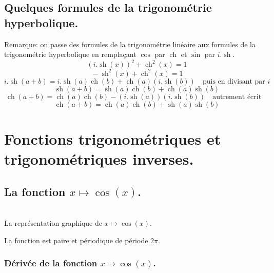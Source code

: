 \documentclass[a4paper,12pt]{report}
\renewcommand{\sinh}{\mathop{\mathrm{sh}}}
\renewcommand{\cosh}{\mathop{\mathrm{ch}}}
\begin{document}
\section{Quelques formules de la trigonométrie hyperbolique.}
Remarque:
on passe des formules de la trigonométrie linéaire aux formules de la trigonométrie hyperbolique en remplaçant $\cos$ par $\cosh$ et $\sin$ par $i . \sinh$.
\begin{equation*}
\quad  (i.\sinh\nolimits(x))^2 + \cosh\nolimits^2(x)  = 1 
\end{equation*}
\begin{equation}
\quad  -\sinh\nolimits^2(x) + \cosh\nolimits^2(x)  = 1 
\end{equation}
\begin{equation*}
i . \sinh(a+b)  = i . \sinh(a)\cosh(b) + \cosh(a)(i . \sinh(b)) \quad \textrm{puis en divisant par } i 
\end{equation*}
\begin{equation}
\quad \sinh(a+b)  = \sinh(a)\cosh(b) + \cosh(a) \sinh(b)
\end{equation} 
\begin{equation*}
\cosh(a+b)  = \cosh(a)\cosh(b) - (i. \sinh(a)) (i.\sinh(b)) \quad \textrm{autrement écrit} 
\end{equation*}
\begin{equation}
\quad \cosh(a+b)  = \cosh(a)\cosh(b) + \sinh(a) \sinh(b) 
\end{equation}





\chapter{Fonctions trigonométriques et trigonométriques inverses.}


\section{La fonction  $x \mapsto \cos(x)$.}

\begin{center}
 \\
La représentation graphique de $x\mapsto \cos(x)$.
\end{center}

La fonction est paire et périodique de période $2 \pi$.

\subsection{Dérivée de la fonction $x \mapsto \cos(x)$.}
\end{document}

